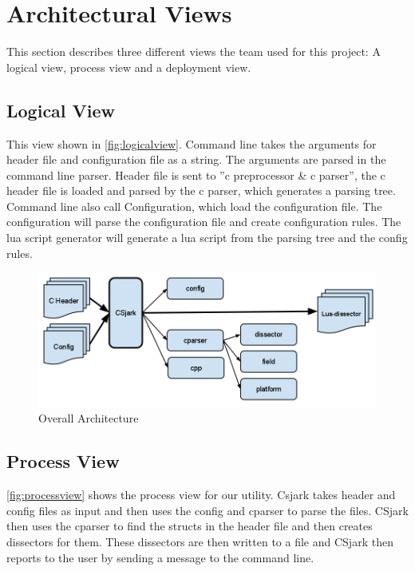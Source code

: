 \section{Architectural Views}
This section describes three different views the team used for this project: A logical view, process view and a deployment view.

\subsection{Logical View}
This view shown in \autoref{fig:logicalview}. Command line takes the arguments for \gls{header} file and configuration file as a string. The arguments are parsed in the command line \gls{parser}. Header file is sent to ''\Gls{c} \gls{preprocessor} \& \Gls{c} \gls{parser}'', the \Gls{c} \gls{header} file is loaded and parsed by the \Gls{c} \gls{parser}, which generates a parsing tree. Command line also call Configuration, which load the configuration file. The configuration will parse the configuration file and create configuration rules. The \Gls{lua} \gls{script} generator will generate a \Gls{lua} \gls{script} from the parsing tree and the config rules.

\begin{figure}[htb]
	\includegraphics[width=\textwidth]{./planning/img/final_arch}
	\caption{Overall Architecture\label{fig:logicalview}}
\end{figure}

\subsection{Process View}
\autoref{fig:processview} shows the process view for our \gls{utility}. Csjark takes \gls{header} and config files as input and then uses the config and cparser to parse the files. CSjark then uses the cparser to find the \glspl{struct} in the \gls{header} file and then creates \glspl{dissector} for them. These \glspl{dissector} are then written to a file and CSjark then reports to the user by sending a message to the command line.


